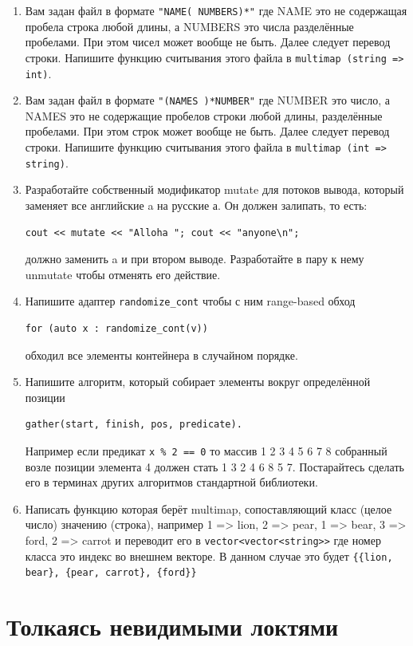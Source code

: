 \documentclass[a4paper,12pt,oneside]{article}
\newif\ifmulti
\begin{document}
\begin{enumerate}
\item 
Вам задан файл в формате \lstinline!"NAME( NUMBERS)*"! где NAME это не содержащая пробела строка любой длины, а NUMBERS это числа разделённые пробелами. При этом чисел может вообще не быть. Далее следует перевод строки. Напишите функцию считывания этого файла в \lstinline!multimap (string => int)!.
\item 
Вам задан файл в формате \lstinline!"(NAMES )*NUMBER"! где NUMBER это число, а NAMES это не содержащие пробелов строки любой длины, разделённые пробелами. При этом строк может вообще не быть. Далее следует перевод строки. Напишите функцию считывания этого файла в \lstinline!multimap (int => string)!.
\item 
Разработайте собственный модификатор mutate для потоков вывода, который заменяет все английские a на русские а. Он должен залипать, то есть:
\begin{lstlisting}
cout << mutate << "Alloha "; cout << "anyone\n"; 
\end{lstlisting}
должно заменить a и при втором выводе. Разработайте в пару к нему unmutate чтобы отменять его действие.
\item 
Напишите адаптер \lstinline!randomize_cont! чтобы с ним range-based обход 
\begin{lstlisting}
for (auto x : randomize_cont(v)) 
\end{lstlisting}
обходил все элементы контейнера в случайном порядке.
\item 
Напишите алгоритм, который собирает элементы вокруг определённой позиции 
\begin{lstlisting}
gather(start, finish, pos, predicate). 
\end{lstlisting}
Например если предикат \lstinline!x % 2 == 0! то массив 1 2 3 4 5 6 7 8 собранный возле позиции элемента 4 должен стать 1 3 2 4 6 8 5 7. Постарайтесь сделать его в терминах других алгоритмов стандартной библиотеки.
\item 
Написать функцию которая берёт multimap, сопоставляющий класс (целое число) значению (строка), например 
1 => lion, 2 => pear, 1 => bear, 3 => ford, 2 => carrot 
и переводит его в \lstinline!vector<vector<string>>! где номер класса это индекс во внешнем векторе. В данном случае это будет \lstinline!{{lion, bear}, {pear, carrot}, {ford}}!
\end{enumerate}

\ifmulti

\pagebreak
\section{Толкаясь невидимыми локтями}
\end{document}
